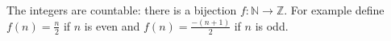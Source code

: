 The integers are countable: there is a bijection $f : \mathbb{N} \to \mathbb{Z}$.
For example define $f(n) = \frac{n}{2}$ if $n$ is even and $f(n) = \frac{-(n + 1)}{2}$ if $n$ is odd.